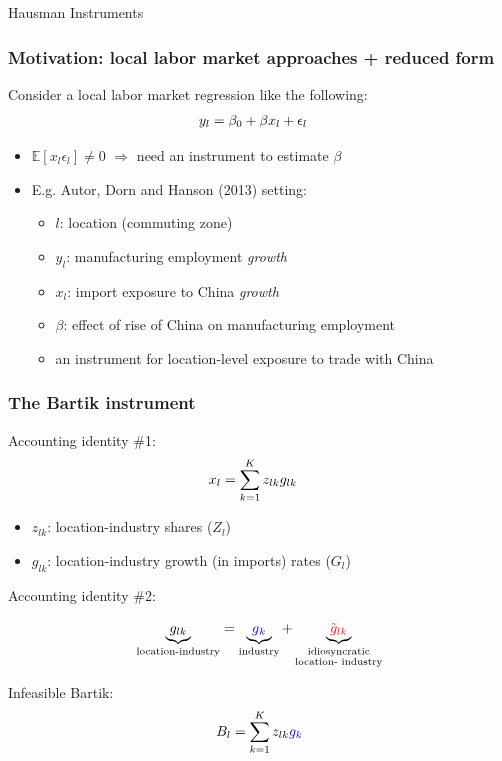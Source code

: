 \documentclass[notes,11pt, aspectratio=169]{beamer}
\begin{document}
\begin{frame}{Hausman Instruments}
  \frametitle{Motivation: local labor market approaches + reduced form}

  Consider a local labor market regression like the following:  
  \begin{align}
    y_l &= \beta_0 + \beta x_l + \epsilon_l \notag 
  \end{align}

  \begin{itemize}
    \setlength\itemsep{1em}
  \item $\mathbb{E}[x_l\epsilon_l] \neq 0$   $\Rightarrow$ need an instrument to estimate $\beta$ 
  \item E.g. Autor, Dorn and Hanson (2013) setting:
    \begin{itemize}
      \setlength\itemsep{1em}
    \item $l$: location (commuting zone)
    \item $y_l$: manufacturing employment \textit{growth}
    \item  $x_l$: import exposure to China \textit{growth}
    \item $\beta$: effect of rise of China on manufacturing employment
    \item an instrument for location-level exposure to trade with China
    \end{itemize}
\end{itemize}


\end{frame}


\begin{frame}
\frametitle{The Bartik instrument}

Accounting identity \#1:
\begin{align}
  x_l &=  \sum_{k=1}^{K} z_{lk} g_{lk} \notag  
\end{align}
\begin{itemize}
\setlength\itemsep{1em}
  \item $z_{lk}$: location-industry shares  ($Z_l$)
  \item $g_{lk} $: location-industry growth (in imports) rates ($G_l$) 
  \end{itemize}
Accounting identity \#2:

$$\underbrace{ g_{lk}}_{\text{location-industry}} = \underbrace{  \textcolor{blue}{g}_{ \textcolor{blue}{k}}}_{\text{industry}} + \underbrace{  \textcolor{red}{\tilde{g}_{lk}}   }_{\substack{\text{idiosyncratic} \\ \text{location- industry}}} $$ 

Infeasible Bartik:
$$B_l = \sum_{k=1}^{K}z_{lk} \textcolor{blue}{g_{k}}$$

\end{frame}
\end{document}
